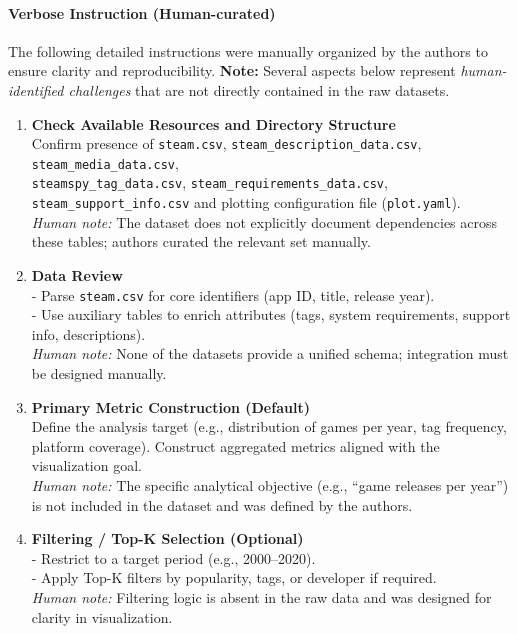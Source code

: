 \paragraph{Verbose Instruction (Human-curated)}

The following detailed instructions were manually organized by the authors to ensure clarity and reproducibility. 
\textbf{Note:} Several aspects below represent \emph{human-identified challenges} that are not directly contained in the raw datasets.

\begin{enumerate}[itemsep=0pt, parsep=0pt, topsep=0pt, leftmargin=2em]
    \item \textbf{Check Available Resources and Directory Structure} \\
    Confirm presence of \texttt{steam.csv}, \texttt{steam\_description\_data.csv}, \texttt{steam\_media\_data.csv}, \\
    \texttt{steamspy\_tag\_data.csv}, \texttt{steam\_requirements\_data.csv},  \texttt{steam\_support\_info.csv} and plotting configuration file (\texttt{plot.yaml}). \\
    \emph{Human note:} The dataset does not explicitly document dependencies across these tables; authors curated the relevant set manually.

    \item \textbf{Data Review} \\
    - Parse \texttt{steam.csv} for core identifiers (app ID, title, release year). \\
    - Use auxiliary tables to enrich attributes (tags, system requirements, support info, descriptions). \\
    \emph{Human note:} None of the datasets provide a unified schema; integration must be designed manually.

    \item \textbf{Primary Metric Construction (Default)} \\
    Define the analysis target (e.g., distribution of games per year, tag frequency, platform coverage). Construct aggregated metrics aligned with the visualization goal. \\
    \emph{Human note:} The specific analytical objective (e.g., ``game releases per year'') is not included in the dataset and was defined by the authors.

    \item \textbf{Filtering / Top-K Selection (Optional)} \\
    - Restrict to a target period (e.g., 2000--2020). \\
    - Apply Top-K filters by popularity, tags, or developer if required. \\
    \emph{Human note:} Filtering logic is absent in the raw data and was designed for clarity in visualization.


\end{enumerate}
